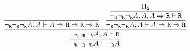\begin{enumerate}[(i)]
            $$
                \infer{
                    \ngr \ngr \ngr A \vdash \ngr A
                }{
                    \infer{
                        \ngr \ngr \ngr A, A \vdash \R
                    }{
                        \infer{
                            \ngr \ngr \ngr A, A \vdash A\Rightarrow\R\Rightarrow\R\Rightarrow\R
                        }{
                        }&
                        \infer{
                            \ngr \ngr \ngr A, A \vdash A\Rightarrow\R\Rightarrow\R
                        }{
                            \infer{
                                \ngr \ngr \ngr A, A, A\Rightarrow\R \vdash \R
                            }{
                                \Pi_2
                            }
                        }
                    }
                }
            $$
    \end{enumerate}
